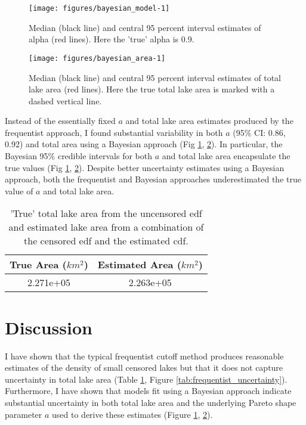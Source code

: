 \documentclass{article}
\begin{document}
\begin{figure}
	\centering
	\texttt{[image: figures/bayesian\_model-1]}
	\caption{Median (black line) and central 95 percent interval estimates of alpha (red lines). Here the 'true' alpha is 0.9.}
	\label{fig:bayesian_model}
\end{figure}

\begin{figure}
	\centering
	\texttt{[image: figures/bayesian\_area-1]}
	\caption{Median (black line) and central 95 percent interval estimates of total lake area (red lines). Here the true total lake area is marked with a dashed vertical line.}
	\label{fig:bayesian_area}
\end{figure}

Instead of the essentially fixed $a$ and total lake area estimates produced by the frequentist approach, I found substantial variability in both $a$ (95\% CI: 0.86, 0.92) and total area using a Bayesian approach (Fig \ref{fig:bayesian_model}, \ref{fig:bayesian_area}). In particular, the Bayesian 95\% credible intervals for both $a$ and total lake area encapsulate the true values (Fig \ref{fig:bayesian_model}, \ref{fig:bayesian_area}). Despite better uncertainty estimates using a Bayesian approach, both the frequentist and Bayesian approaches underestimated the true value of $a$ and total lake area.

\begin{table}
	\caption{'True' total lake area from the uncensored edf and estimated lake area from a combination of the censored edf and the estimated cdf.}
	\centering
	\begin{tabular}{cc}
		\toprule
		True Area ($km^2$) & Estimated Area ($km^2$) \\
		\midrule
		2.271e+05          & 2.263e+05               \\
		\bottomrule
	\end{tabular}
	\label{tab:pred_table}
\end{table}

\section{Discussion}

I have shown that the typical frequentist cutoff method produces reasonable estimates of the density of small censored lakes but that it does not capture uncertainty in total lake area (Table \ref{tab:pred_table}, Figure \ref{tab:frequentist_uncertainty}). Furthermore, I have shown that models fit using a Bayesian approach indicate substantial uncertainty in both total lake area and the underlying Pareto shape parameter $a$ used to derive these estimates (Figure \ref{fig:bayesian_model}, \ref{fig:bayesian_area}).
\end{document}
